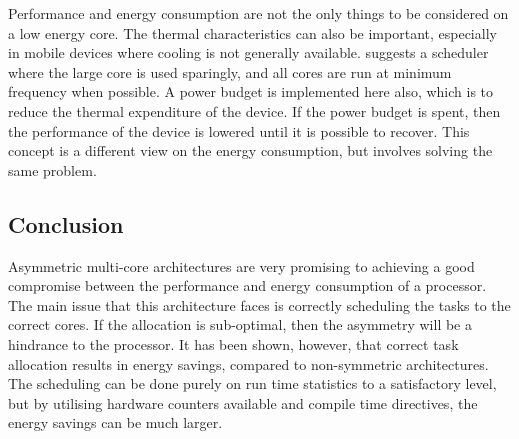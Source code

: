 Performance and energy consumption are not the only things to be considered on a low energy core.
The thermal characteristics can also be important, especially in mobile devices where cooling is not generally available. 
\cite{muthukaruppan2013hierarchical} suggests a scheduler where the large core is used sparingly, and all cores are run at minimum frequency when possible. 
A power budget is implemented here also, which is to reduce the thermal expenditure of the device. 
If the power budget is spent, then the performance of the device is lowered until it is possible to recover. 
This concept is a different view on the energy consumption, but involves solving the same problem. 


\subsection{Conclusion}


Asymmetric multi-core architectures are very promising to achieving a good compromise between the performance and energy consumption of a processor. 
The main issue that this architecture faces is correctly scheduling the tasks to the correct cores. 
If the allocation is sub-optimal, then the asymmetry will be a hindrance to the processor. 
It has been shown, however, that correct task allocation results in energy savings, compared to non-symmetric architectures. 
The scheduling can be done purely on run time statistics to a satisfactory level, but by utilising hardware counters available and compile time directives, the energy savings can be much larger.
